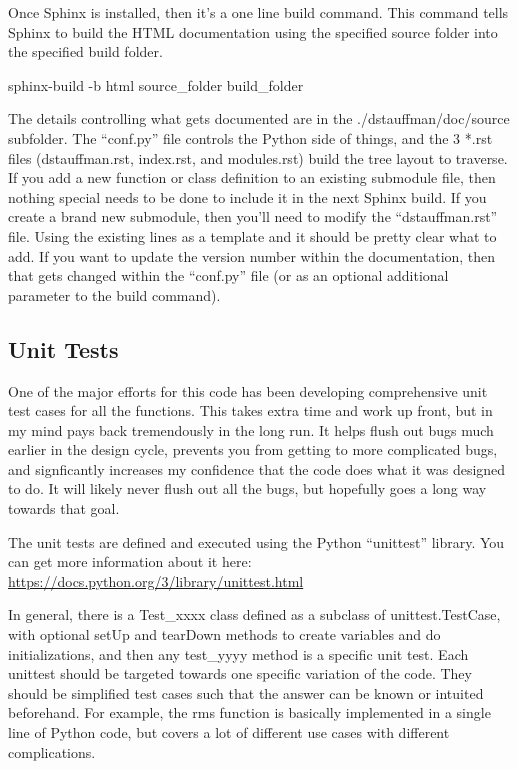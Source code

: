 \documentclass[12pt]{article}
\begin{document}
Once Sphinx is installed, then it's a one line build command.  This command tells Sphinx to build the HTML documentation using the specified source folder into the specified build folder.
\begin{PlainText}
sphinx-build -b html source_folder build_folder
\end{PlainText}

The details controlling what gets documented are in the ./dstauffman/doc/source subfolder.  The ``conf.py'' file controls the Python side of things, and the 3 *.rst files (dstauffman.rst, index.rst, and modules.rst) build the tree layout to traverse.  If you add a new function or class definition to an existing submodule file, then nothing special needs to be done to include it in the next Sphinx build.  If you create a brand new submodule, then you'll need to modify the ``dstauffman.rst'' file.  Using the existing lines as a template and it should be pretty clear what to add.  If you want to update the version number within the documentation, then that gets changed within the ``conf.py'' file (or as an optional additional parameter to the build command).

\subsection{Unit Tests}\label{h2:Unit_tests}
One of the major efforts for this code has been developing comprehensive unit test cases for all the functions.  This takes extra time and work up front, but in my mind pays back tremendously in the long run.  It helps flush out bugs much earlier in the design cycle, prevents you from getting to more complicated bugs, and signficantly increases my confidence that the code does what it was designed to do.  It will likely never flush out all the bugs, but hopefully goes a long way towards that goal.

The unit tests are defined and executed using the Python ``unittest'' library.  You can get more information about it here: \url{https://docs.python.org/3/library/unittest.html}

In general, there is a Test\_xxxx class defined as a subclass of unittest.TestCase, with optional setUp and tearDown methods to create variables and do initializations, and then any test\_yyyy method is a specific unit test.  Each unittest should be targeted towards one specific variation of the code.  They should be simplified test cases such that the answer can be known or intuited beforehand.  For example, the rms function is basically implemented in a single line of Python code, but covers a lot of different use cases with different complications.
\end{document}
